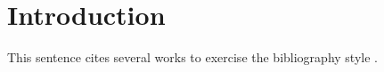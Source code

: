 \documentclass[acmsmall,nonacm]{acmart}
\begin{document}
\thispagestyle{empty}%

\section{Introduction}
This sentence cites several works to exercise the bibliography style
\cite{Ablamowicz07} \cite{JCohen96} \cite{Clarkson:1985:ACP:911891} \cite{Hollis:1999:VBD:519964} \cite{Goossens:1999:LWC:553897} \cite{Buss:1987:VTB:897367} \cite{Li:2008:PUC:1358628.1358946} \cite{Conti:2009:DDS:1555009.1555162}.



\end{document}
